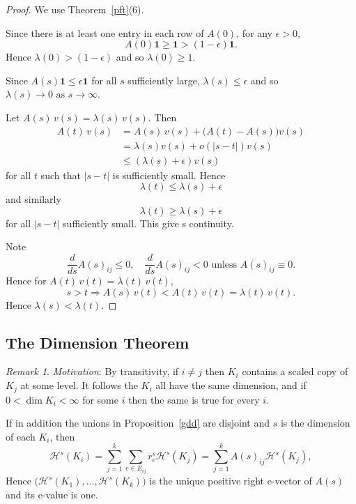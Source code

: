 \documentclass[a4paper]{amsart}
\theoremstyle{plain}
\theoremstyle{definition}
\theoremstyle{remark}
\newtheorem{remark}[theorem]{Remark}
\begin{document}
\begin{proof}  We use Theorem~\ref{pft}(6).

\medskip Since there is at least one entry in each row of $ A(0) $, for any $ \epsilon > 0 $,  
\[ A(0)\boldsymbol{1} \geq \boldsymbol{1} > (1-\epsilon)  \boldsymbol{1} .
\]
Hence $ \lambda (0)> (1-\epsilon ) $ and so $ \lambda(0) \geq 1 $.

\medskip
Since $ A(s) \boldsymbol{1} \leq \epsilon \boldsymbol{1} $ for all $ s $ sufficiently large, $ \lambda (s) \leq \epsilon $ and so $ \lambda(s)\to 0 \text{ as } s \to \infty $.

\medskip Let $ A(s)\, v(s) = \lambda (s)\, v(s) $. Then
\begin{align*}
A(t )\, v(s) &= A(s)\, v(s) + \big( A(t ) - A(s) \big) v(s) \\
   &= \lambda (s) v(s) + o(|s-t| ) v(s) \\
   &\leq ( \lambda(s) + \epsilon ) v(s) 
\end{align*}
for all $ t $ such that $ |s-t| $ is sufficiently small.  Hence 
\[
\lambda(t)\leq \lambda(s) + \epsilon 
\]
and similarly 
\[
\lambda(t)\geq \lambda(s) + \epsilon 
\]
for all $ |s-t| $ sufficiently small. This give s continuity.

\medskip Note 
\[
\frac{d}{ds}A(s)_{ij} \leq 0, \quad \frac{d}{ds}A(s)_{ij} < 0 \text{ unless } A(s)_{ij} \equiv 0 .
\]
Hence for $ A(t)\, v(t) = \lambda (t)\, v(t)$,
\[
s > t \Longrightarrow A(s)\, v(t) < A(t)\, v(t) = \lambda (t)\, v(t).
\] 
Hence $ \lambda(s) < \lambda (t ) $. 
\end{proof} 
 
\subsection{The Dimension Theorem}  

\begin{remark}
 \emph{Motivation}: By transitivity, if $ i \neq j $ then  $ K_i $ contains a scaled copy of $ K_j $ at some level.  It follows the $ K_i $ all have the same dimension, and if $ 0<\dim K_i <\infty $ for some $ i $ then the same is true for every $ i $.

If in addition the unions in Proposition~\ref{gdd} are disjoint and $ s $ is the dimension of each $ K_i $, then
\[
\mathcal{H} ^s(K_i) = \sum_{j=1}^k \sum_{e \in E_{ij}} r_e^s \mathcal{H} ^s(K_j) 
   = \sum_{j=1}^k A(s)_{ij} \mathcal{H} ^s(K_j) ,
   \]
Hence $\big(\mathcal{H} ^s(K_1), \dots,  \mathcal{H} ^s(K_k)\big) $        is the unique positive right e-vector 
of $ A(s) $ and its e-value is one.
  \end{remark}
\end{document}
